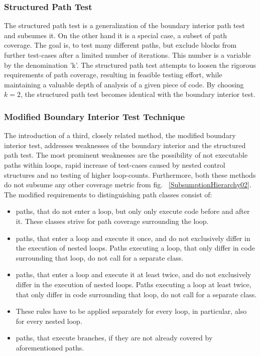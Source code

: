 		\subsubsection{Structured Path Test}
		The structured path test is a generalization of the boundary interior path test and subsumes it. On the other hand it is a special case, a subset of path coverage. The goal is, to test many different paths, but exclude blocks from further test-cases after a limited number of iterations. This number is a variable by the denomination 'k'. The structured path test attempts to loosen the rigorous requirements of path coverage, resulting in feasible testing effort, while maintaining a valuable depth of analysis of a given piece of code. By choosing $ k = 2 $, the structured path test becomes identical with the boundary interior test. \cite{Howden1978AnEO}
		\subsubsection{Modified Boundary Interior Test Technique}
		The introduction of a third, closely related method, the modified boundary interior test, addresses weaknesses of the boundary interior and the structured path test. The most prominent weaknesses are the possibility of not executable paths within loops, rapid increase of test-cases caused by nested control structures and no testing of higher loop-counts. Furthermore, both these methods do not subsume any other coverage metric from fig. ~\ref{SubsumptionHierarchy02}. 
		The modified requirements to distinguishing path classes consist of:
		\begin{itemize} \setlength\itemsep{1px}
		\item paths, that do not enter a loop, but only only execute code before and after it. These classes strive for path coverage surrounding the loop.
		\item paths, that enter a loop and execute it once, and do not exclusively differ in the execution of nested loops. Paths executing a loop, that only differ in code surrounding that loop, do not call for a separate class.
		\item paths, that enter a loop and execute it at least twice, and do not exclusively differ in the execution of nested loops. Paths executing a loop at least twice, that only differ in code surrounding that loop, do not call for a separate class.
		\item These rules have to be applied separately for every loop, in particular, also for every nested loop.
		\item paths, that execute branches, if they are not already covered by aforementioned paths.
		\end{itemize}
		
